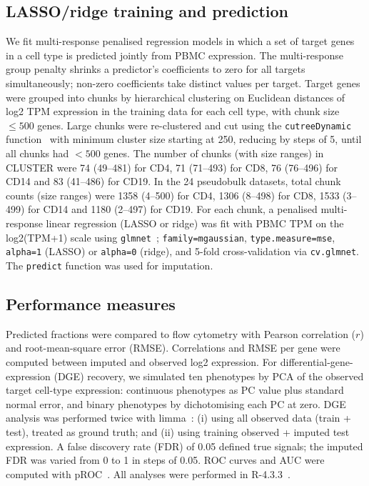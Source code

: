 \documentclass[11pt]{article}
\begin{document}
\subsection{LASSO/ridge training and prediction}
We fit multi-response penalised regression models in which a set of target genes in a cell type is predicted jointly from PBMC expression. The multi-response group penalty shrinks a predictor's coefficients to zero for all targets simultaneously; non-zero coefficients take distinct values per target. Target genes were grouped into chunks by hierarchical clustering on Euclidean distances of log2 TPM expression in the training data for each cell type, with chunk size $\leq 500$ genes. Large chunks were re-clustered and cut using the \texttt{cutreeDynamic} function~\citep{langfelder2008wgcna} with minimum cluster size starting at 250, reducing by steps of 5, until all chunks had $<500$ genes. The number of chunks (with size ranges) in CLUSTER were 74 (49--481) for CD4, 71 (71--493) for CD8, 76 (76--496) for CD14 and 83 (41--486) for CD19. In the 24 pseudobulk datasets, total chunk counts (size ranges) were 1358 (4--500) for CD4, 1306 (8--498) for CD8, 1533 (3--499) for CD14 and 1180 (2--497) for CD19. For each chunk, a penalised multi-response linear regression (LASSO or ridge) was fit with PBMC TPM on the log2(TPM+1) scale using \texttt{glmnet}~\citep{friedman2010glmnet}; \texttt{family=mgaussian}, \texttt{type.measure=mse}, \texttt{alpha=1} (LASSO) or \texttt{alpha=0} (ridge), and 5-fold cross-validation via \texttt{cv.glmnet}. The \texttt{predict} function was used for imputation.

\subsection{Performance measures}
Predicted fractions were compared to flow cytometry with Pearson correlation ($r$) and root-mean-square error (RMSE). Correlations and RMSE per gene were computed between imputed and observed log2 expression. For differential-gene-expression (DGE) recovery, we simulated ten phenotypes by PCA of the observed target cell-type expression: continuous phenotypes as PC value plus standard normal error, and binary phenotypes by dichotomising each PC at zero. DGE analysis was performed twice with limma~\citep{ritchie2015limma}: (i) using all observed data (train + test), treated as ground truth; and (ii) using training observed + imputed test expression. A false discovery rate (FDR) of 0.05 defined true signals; the imputed FDR was varied from 0 to 1 in steps of 0.05. ROC curves and AUC were computed with pROC~\citep{robin2011proc}. All analyses were performed in R-4.3.3~\citep{rproject2024}.
\end{document}
